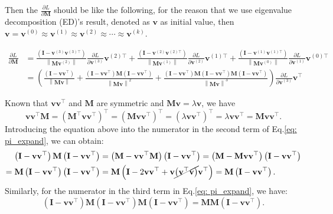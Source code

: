 \documentclass{article}
\newcommand{\bM}{\mathbf{M}}
\newcommand{\bv}{\mathbf{v}}
\newcommand{\bI}{\mathbf{I}}
\begin{document}
	Then the $\frac{\partial L}{\partial \bM}$ should be like the following, for the reason that we use eigenvalue decomposition (ED)'s result, denoted as $\bv$ as initial value, then $\bv {=} \bv^{(0)} {\approx}\bv^{(1)} {\approx} \bv^{(2)}{\approx} \cdots {\approx}\bv^{(k)}$. 
	
	\begin{equation}
	\begin{aligned} 
	\frac{\partial L}{\partial \bM}
	&{=}\frac{\left(\bI-\bv^{(3)} \bv^{(3)\top}\right)}{\left\|\bM \bv^{(2)}\right\|} \frac{\partial L}{\partial \bv^{(3)}} \bv^{(2)\top} +
	\frac{\left(\bI-\bv^{(2)} \bv^{(2)\top}\right)}{\left\|\bM \bv^{(1)}\right\|} \frac{\partial L}{\partial \bv^{(2)}} \bv^{(1)\top} + 
	\frac{\left(\bI-\bv^{(1)} \bv^{(1)\top}\right)}{\left\|\bM \bv^{(0)}\right\|} \frac{\partial L}{\partial \bv^{(1)}} \bv^{(0)\top}\\
	&{=} \left( \frac{\left(\bI {-} \bv \bv^{\top}\right)}{\left\|\bM \bv\right\|} {+}
	 \frac{\left(\bI {-} \bv \bv^{\top}\right) \bM  \left(\bI {-} \bv \bv^{\top}\right)}{\left\|\bM \bv\right\|^{2}}  {+} 
	 \frac{\left(\bI {-} \bv \bv^{\top}\right) \bM \left(\bI {-} \bv \bv^{\top}\right) \bM \left(\bI {-} \bv \bv^{\top}\right)}{\left\|\bM \bv\right\|^{3}} \right)
	 \frac{\partial L}{\partial \bv^{(3)}} \bv^{\top}
	\end{aligned}
	\label{eq: pi_expand}
	\end{equation}
	
	Known that $\bv \bv^{\top}$ and $\bM$ are symmetric and $\bM \bv = \lambda \bv$, we have 
$$\bv\bv^{\top}\bM = (\bM^{\top}\bv\bv^{\top})^{\top} = (\bM\bv\bv^{\top})^{\top} = (\lambda\bv\bv^{\top})^{\top} = \lambda\bv\bv^{\top} = \bM\bv\bv^{\top}.$$
	Introducing the equation above into the numerator in the second term of Eq.\ref{eq: pi_expand}, we can obtain:
	\begin{equation}
	\begin{aligned}
	\left(\bI - \bv \bv^{\top}\right) \bM  \left(\bI - \bv \bv^{\top}\right) &
	= \left(\bM - \bv \bv^{\top}\bM\right) \left(\bI - \bv \bv^{\top}\right) 
	=  \left(\bM - \bM \bv \bv^{\top}\right) \left(\bI - \bv \bv^{\top}\right) \\
	= \bM \left(\bI - \bv \bv^{\top}\right) \left(\bI - \bv \bv^{\top}\right) &
	= \bM \left(\bI - 2\bv \bv^{\top} + \bv \cancel{\left(\bv^{\top}\bv \right)} \bv^{\top}\right) 
	= \bM \left(\bI - \bv \bv^{\top} \right).
	\end{aligned}
	\label{eq: term1}
	\end{equation}
	Similarly, for the numerator in the third term in Eq.\ref{eq: pi_expand}, we have:
	\begin{equation}
	\left(\bI - \bv \bv^{\top}\right) \bM \left(\bI - \bv \bv^{\top}\right) \bM \left(\bI - \bv \bv^{\top}\right) = \bM \bM \left(\bI - \bv \bv^{\top} \right).
	\label{eq: term2}
	\end{equation}
	
\end{document}
